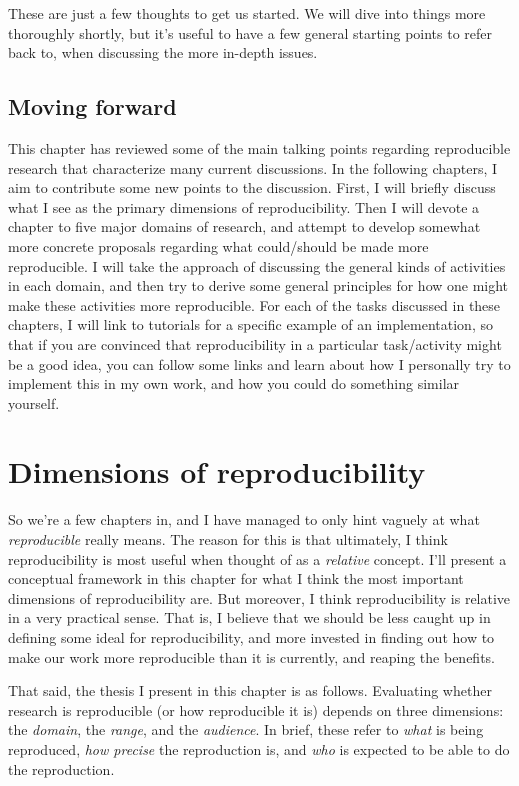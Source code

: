 \documentclass{book}
\begin{document}
\begin{enumerate}
\end{enumerate}

These are just a few thoughts to get us started.  We will dive into things more thoroughly shortly, but it's useful to have a few general starting points to refer back to, when discussing the more in-depth issues.
\section{Moving forward}
\label{sec-2-6}

This chapter has reviewed some of the main talking points regarding reproducible research that characterize many current discussions. In the following chapters, I aim to contribute some new points to the discussion. First, I will briefly discuss what I see as the primary dimensions of reproducibility. Then I will devote a chapter to five major domains of research, and attempt to develop somewhat more concrete proposals regarding what could/should be made more reproducible. I will take the approach of discussing the general kinds of activities in each domain, and then try to derive some general principles for how one might make these activities more reproducible.  For each of the tasks discussed in these chapters, I will link to tutorials for a specific example of an implementation, so that if you are convinced that reproducibility in a particular task/activity might be a good idea, you can follow some links and learn about how I personally try to implement this in my own work, and how you could do something similar yourself.
\chapter{Dimensions of reproducibility}
\label{sec-3}
\label{dimensions}

So we're a few chapters in, and I have managed to only hint vaguely at what \emph{reproducible} really means.  The reason for this is that ultimately, I think reproducibility is most useful when thought of as a \emph{relative} concept. I'll present a conceptual framework in this chapter for what I think the most important dimensions of reproducibility are. But moreover, I think reproducibility is relative in a very practical sense. That is, I believe that we should be less caught up in defining some ideal for reproducibility, and more invested in finding out how to make our work more reproducible than it is currently, and reaping the benefits.

That said, the thesis I present in this chapter is as follows. Evaluating whether research is reproducible (or how reproducible it is) depends on three dimensions: the \emph{domain}, the \emph{range}, and the \emph{audience}.  In brief, these refer to \emph{what} is being reproduced, \emph{how precise} the reproduction is, and \emph{who} is expected to be able to do the reproduction. 
\end{document}
